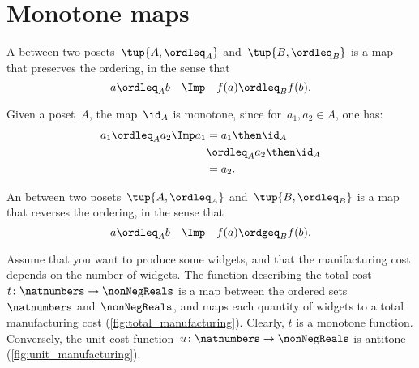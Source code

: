 \section{Monotone maps}\label{sec:monotonicity-monotone-maps}

\begin{definition}
  \label{def:monotone}
  A \emph{} between two posets~$\tup{A, \ordleq_A}$ and~$\tup{B, \ordleq_B}$ is a map that preserves the ordering, in the sense that
  \begin{equation*}
    a \ordleq_A b \quad \Imp \quad f(a) \ordleq_B f(b).
  \end{equation*}
\end{definition}
\begin{remark}
  Given a poset~$A$, the map~$\id_A$ is monotone, since for~$a_1,a_2\in A$, one has:
  \begin{equation*}
    \begin{aligned}
      a_1\ordleq_A a_2 \Imp a_1&=a_1\then \id_A\\
      &\ordleq_A a_2\then \id_A \\
      &= a_2.
    \end{aligned}
  \end{equation*}
\end{remark}

\begin{definition}
  \label{def:antitone}
  An \emph{} between two posets~$\tup{A, \ordleq_A}$ and~$\tup{B, \ordleq_B}$ is a map that reverses the ordering, in the sense that
  \begin{equation*}
    a \ordleq_A b \quad \Imp \quad f(a) \ordgeq_B f(b).
  \end{equation*}
\end{definition}


\begin{comment}
  A monotone map is an \emph{order isomorphism} if the other direction
  of the implication holds as well:
  \begin{equation}
    a \leq_A b \quad \Leftrightarrow \quad f(a) \leq_B f(b).
  \end{equation}
\end{comment}

\begin{example}
  Assume that you want to produce some widgets, and that the manifacturing cost depends on the number of widgets.
  The function describing the total cost~$t\colon \natnumbers\to \nonNegReals$ is a map between the ordered sets~$\natnumbers$ and~$\nonNegReals$, and maps each quantity of widgets to a total manufacturing cost (\cref{fig:total_manufacturing}).
  Clearly, $t$ is a monotone function.
  Conversely, the unit cost function~$u\colon \natnumbers\to \nonNegReals$ is antitone (\cref{fig:unit_manufacturing}).
\end{example}

